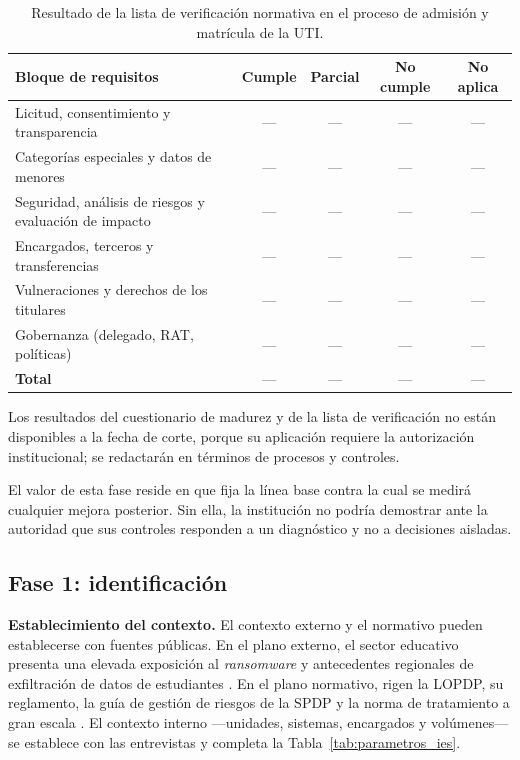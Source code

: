 \begin{table}[htbp]
  \centering
  \caption{Resultado de la lista de verificación normativa en el proceso de admisión y matrícula de la UTI.}
  \label{tab:verificacion_normativa}
  \footnotesize
  \renewcommand{\arraystretch}{1.2}
  \begin{tabularx}{\textwidth}{|L|c|c|c|c|}
    \hline
    \textbf{Bloque de requisitos} & \textbf{Cumple} & \textbf{Parcial} & \textbf{No cumple} & \textbf{No aplica} \\
    \hline
    Licitud, consentimiento y transparencia & --- & --- & --- & --- \\
    \hline
    Categorías especiales y datos de menores & --- & --- & --- & --- \\
    \hline
    Seguridad, análisis de riesgos y evaluación de impacto & --- & --- & --- & --- \\
    \hline
    Encargados, terceros y transferencias & --- & --- & --- & --- \\
    \hline
    Vulneraciones y derechos de los titulares & --- & --- & --- & --- \\
    \hline
    Gobernanza (delegado, RAT, políticas) & --- & --- & --- & --- \\
    \hline
    \textbf{Total} & --- & --- & --- & --- \\
    \hline
  \end{tabularx}
  \raggedright
\end{table}

Los resultados del cuestionario de madurez y de la lista de verificación no están disponibles a la fecha de corte, porque su aplicación requiere la autorización institucional; se redactarán en términos de procesos y controles.

El valor de esta fase reside en que fija la línea base contra la cual se medirá cualquier mejora posterior. Sin ella, la institución no podría demostrar ante la autoridad que sus controles responden a un diagnóstico y no a decisiones aisladas.

\subsection{Fase 1: identificación}

\textbf{Establecimiento del contexto.} El contexto externo y el normativo pueden establecerse con fuentes públicas. En el plano externo, el sector educativo presenta una elevada exposición al \textit{ransomware} \cite{sophos2024education} y antecedentes regionales de exfiltración de datos de estudiantes \cite{cnnchile2024usm,semana2023unal}. En el plano normativo, rigen la LOPDP, su reglamento, la guía de gestión de riesgos de la SPDP y la norma de tratamiento a gran escala \cite{lopdp2021,rlopdp2023,spdp2026guiav2,spdp2026granescala}. El contexto interno ---unidades, sistemas, encargados y volúmenes--- se establece con las entrevistas y completa la Tabla~\ref{tab:parametros_ies}.

